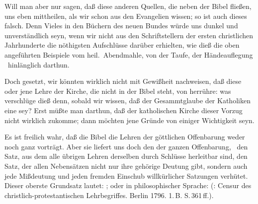 \begin{aufza}
\begin{aufzb}[1.]
\item Will man aber nur sagen, daß diese anderen Quellen, die neben der Bibel fließen, uns eben  mittheilen, als wir schon aus den Evangelien wissen; so ist auch dieses falsch. Denn Vieles in den Büchern des neuen Bundes würde uns dunkel und unverständlich seyn, wenn wir nicht aus den Schriftstellern der ersten christlichen Jahrhunderte die nöthigsten Aufschlüsse darüber erhielten, wie dieß die oben angeführten Beispiele vom heil.\ Abendmahle, von der Taufe, der Händeauflegung \usw\ hinlänglich darthun.
\item Doch gesetzt, wir könnten wirklich nicht mit Gewißheit nachweisen, daß diese oder jene Lehre der Kirche, die nicht in der Bibel steht, von  herrühre: was verschlüge dieß denn, sobald wir wissen, daß der Gesammtglaube der Katholiken eine  sey? Erst müßte man darthun, daß der katholischen Kirche dieser Vorzug nicht wirklich zukomme; dann möchten jene Gründe von einiger Wichtigkeit seyn.
\end{aufzb}
\item {} Es ist freilich wahr, daß die Bibel die Lehren der göttlichen Offenbarung weder  noch ganz  vorträgt. Aber sie liefert uns doch den  der ganzen Offenbarung, \dh\ den Satz, aus dem alle übrigen Lehren derselben durch Schlüsse herleitbar sind, den Satz, der allen Nebensätzen nicht nur ihre gehörige Deutung gibt, sondern auch jede Mißdeutung und jeden fremden Einschub willkürlicher Satzungen verhütet. Dieser oberste Grundsatz lautet: ; oder in philosophischer Sprache:  (: Censur des christlich-protestantischen Lehrbegriffes. Berlin 1796. 1.\,B. S.\,361\,ff.).

\end{aufza}

